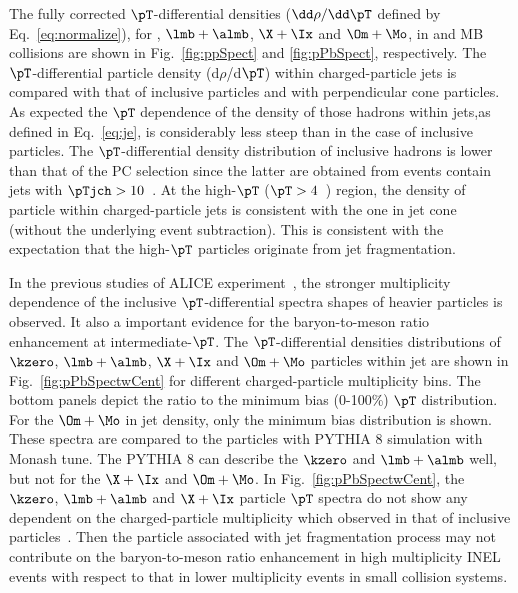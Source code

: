 \documentclass[ALICE,manyauthors]{cernphprep}
\begin{document}
The fully corrected $\pT$-differential densities ($\dd \rho/ \dd \pT$ defined by Eq.~\ref{eq:normalize}), for \kzero, $\lmb + \almb$, $\X + \Ix$ and $\Om + \Mo$, in \pp and MB \pPb collisions are shown in Fig.~\ref{fig:ppSpect} and \ref{fig:pPbSpect}, respectively.
The $\pT$-differential particle density (d$\rho$/d$\pT$) within charged-particle jets is compared with that of inclusive particles and with perpendicular cone particles.
As expected the $\pT$ dependence of the density of those hadrons within jets,as defined in Eq.~\ref{eq:je}, is considerably less steep than in the case of inclusive particles.
The $\pT$-differential density distribution of inclusive hadrons is lower than that of the PC selection since the latter are obtained from events contain jets with $\pTjch > 10$~\GeVc.
At the high-$\pT$ ($\pT > 4$~\GeVc) region, the density of particle within charged-particle jets is consistent with the one in jet cone (without the underlying event subtraction).
This is consistent with the expectation that the high-$\pT$ particles originate from jet fragmentation. 

In the previous studies of ALICE experiment~\cite{ALICE:2015mpp, ALICE:2016dei, ALICE:2013wgn}, the stronger multiplicity dependence of the inclusive $\pT$-differential spectra shapes of heavier particles is observed.
It also a important evidence for the baryon-to-meson ratio enhancement at intermediate-$\pT$.
The $\pT$-differential densities distributions of $\kzero$, $\lmb + \almb$, $\X + \Ix$ and $\Om + \Mo$ particles within jet are shown in Fig.~\ref{fig:pPbSpectwCent} for different charged-particle multiplicity bins.
The bottom panels depict the ratio to the minimum bias (0-100\%) $\pT$ distribution.
For the $\Om + \Mo$ in jet density, only the minimum bias distribution is shown.
These spectra are compared to the particles with PYTHIA 8 simulation with Monash tune.
The PYTHIA 8 can describe the $\kzero$ and $\lmb + \almb$ well, but not for the $\X + \Ix$ and $\Om + \Mo$.
In Fig.~\ref{fig:pPbSpectwCent}, the $\kzero$, $\lmb + \almb$ and $\X + \Ix$  particle $\pT$ spectra do not show any dependent on the charged-particle multiplicity which observed in that of inclusive particles~\cite{ALICE:2015mpp, ALICE:2016dei, ALICE:2013wgn}. 
Then the particle associated with jet fragmentation process may not contribute on the baryon-to-meson ratio enhancement in high multiplicity INEL events with respect to that in lower multiplicity events in small collision systems.
\end{document}
